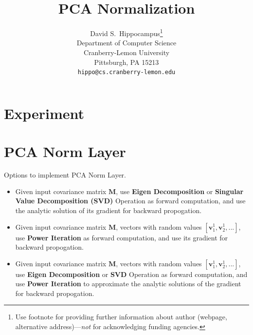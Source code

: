 \documentclass{article}
\title{PCA Normalization}
\author{%
  David S.~Hippocampus\thanks{Use footnote for providing further information
    about author (webpage, alternative address)---\emph{not} for acknowledging
    funding agencies.} \\
  Department of Computer Science\\
  Cranberry-Lemon University\\
  Pittsburgh, PA 15213 \\
  \texttt{hippo@cs.cranberry-lemon.edu} \\
}
\newcommand{\bM}{\mathbf{M}}
\newcommand{\bv}{\mathbf{v}}
\begin{document}
\maketitle

\begin{abstract}

\end{abstract}

\section{Experiment}


\section{PCA Norm Layer}
Options to implement PCA Norm Layer.
\begin{itemize}
\item Given input covariance matrix $\bM$, use \textbf{Eigen Decomposition} or \textbf{Singular Value Decomposition (SVD)} Operation as forward computation, and use the analytic solution of its gradient for backward propogation.
\item Given input covariance matrix $\bM$, vectors with random values $[\bv_1^{1}, \bv_2^{1}, ...]$, use \textbf{Power Iteration} as forward computation, and use its gradient for backward propogation.
\item Given input covariance matrix $\bM$, vectors with random values $[\bv_1^{1}, \bv_2^{1}, ...]$, use \textbf{Eigen Decomposition} or \textbf{SVD} Operation as forward computation, and use \textbf{Power Iteration} to approximate the analytic solutions of the gradient for backward propogation.
\end{itemize}
\end{document}
